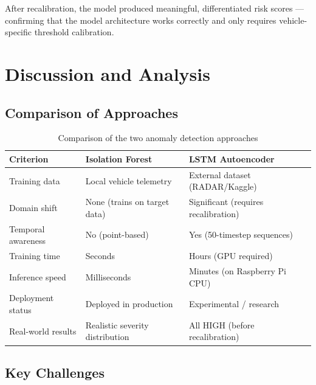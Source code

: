After recalibration, the model produced meaningful, differentiated risk scores --- confirming that the model architecture works correctly and only requires vehicle-specific threshold calibration.


\section{Discussion and Analysis}

\subsection{Comparison of Approaches}

\begin{table}[h]
\centering
\begin{tabular}{|p{4cm}|p{5cm}|p{5cm}|}
\hline
\textbf{Criterion} & \textbf{Isolation Forest} & \textbf{LSTM Autoencoder} \\
\hline
Training data & Local vehicle telemetry & External dataset (RADAR/Kaggle) \\
\hline
Domain shift & None (trains on target data) & Significant (requires recalibration) \\
\hline
Temporal awareness & No (point-based) & Yes (50-timestep sequences) \\
\hline
Training time & Seconds & Hours (GPU required) \\
\hline
Inference speed & Milliseconds & Minutes (on Raspberry Pi CPU) \\
\hline
Deployment status & Deployed in production & Experimental / research \\
\hline
Real-world results & Realistic severity distribution & All HIGH (before recalibration) \\
\hline
\end{tabular}
\caption{Comparison of the two anomaly detection approaches}
\label{tab:comparison}
\end{table}

\subsection{Key Challenges}

